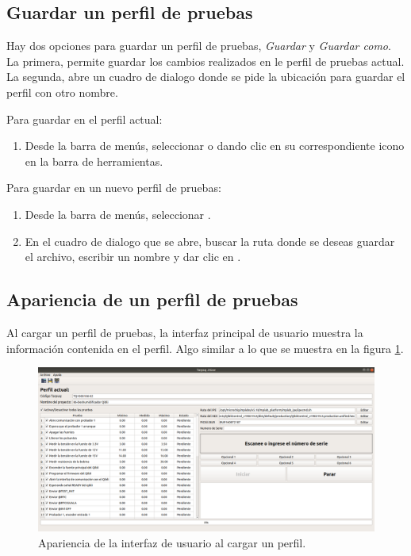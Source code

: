 \documentclass[a4paper,12pt]{refart}
\begin{document}
\subsection{Guardar un perfil de pruebas}
Hay dos opciones para guardar un perfil de pruebas, \textit{Guardar} y \textit{Guardar como}. La primera, permite guardar los cambios realizados en le perfil de pruebas actual. La segunda, abre un cuadro de dialogo donde se pide la ubicación para guardar el perfil con otro nombre.

Para guardar en el perfil actual:
\begin{enumerate}
\item Desde la barra de menús, seleccionar  o dando clic en su correspondiente icono en la barra de herramientas.
\end{enumerate}

Para guardar en un nuevo perfil de pruebas:
\begin{enumerate}
\item Desde la barra de menús, seleccionar .
\item En el cuadro de dialogo que se abre, buscar la ruta donde se deseas guardar el archivo, escribir un nombre y dar clic en .
\end{enumerate}

\subsection{Apariencia de un perfil de pruebas}
Al cargar un perfil de pruebas, la interfaz principal de usuario muestra la información contenida en el perfil. Algo similar a lo que se muestra en la figura \ref{fig:mainLoaded}.

\begin{figure}[hbt!]\centering
\includegraphics[width=\textwidth, frame]{images/main_profile_loaded} 
\caption{Apariencia de la interfaz de usuario al cargar un perfil.}
\label{fig:mainLoaded}
\end{figure}
\end{document}

